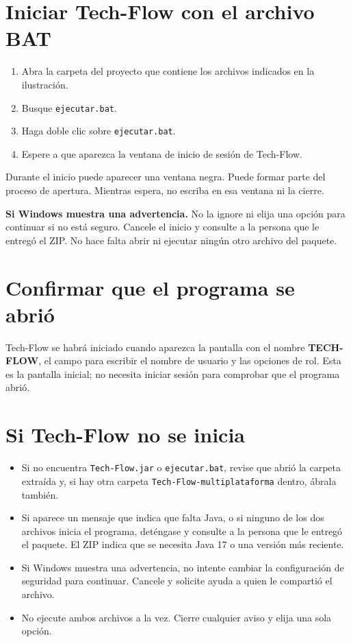 \documentclass[12pt,a4paper]{article}
\begin{document}
\section{Iniciar Tech-Flow con el archivo BAT}
\begin{enumerate}
\item Abra la carpeta del proyecto que contiene los archivos indicados en la ilustración.
\item Busque \texttt{ejecutar.bat}.
\item Haga doble clic sobre \texttt{ejecutar.bat}.
\item Espere a que aparezca la ventana de inicio de sesión de Tech-Flow.
\end{enumerate}
Durante el inicio puede aparecer una ventana negra. Puede formar parte del proceso de apertura. Mientras espera, no escriba en esa ventana ni la cierre.

\begin{warningbox}\textbf{Si Windows muestra una advertencia.} No la ignore ni elija una opción para continuar si no está seguro. Cancele el inicio y consulte a la persona que le entregó el ZIP. No hace falta abrir ni ejecutar ningún otro archivo del paquete.\end{warningbox}

\section{Confirmar que el programa se abrió}
Tech-Flow se habrá iniciado cuando aparezca la pantalla con el nombre \textbf{TECH-FLOW}, el campo para escribir el nombre de usuario y las opciones de rol. Esta es la pantalla inicial; no necesita iniciar sesión para comprobar que el programa abrió.

\section{Si Tech-Flow no se inicia}
\begin{itemize}
\item Si no encuentra \texttt{Tech-Flow.jar} o \texttt{ejecutar.bat}, revise que abrió la carpeta extraída y, si hay otra carpeta \texttt{Tech-Flow-multiplataforma} dentro, ábrala también.
\item Si aparece un mensaje que indica que falta Java, o si ninguno de los dos archivos inicia el programa, deténgase y consulte a la persona que le entregó el paquete. El ZIP indica que se necesita Java 17 o una versión más reciente.
\item Si Windows muestra una advertencia, no intente cambiar la configuración de seguridad para continuar. Cancele y solicite ayuda a quien le compartió el archivo.
\item No ejecute ambos archivos a la vez. Cierre cualquier aviso y elija una sola opción.
\end{itemize}
\end{document}
